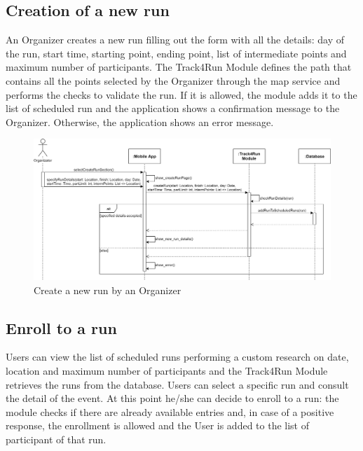 \subsection{Creation of a new run}
An Organizer creates a new run filling out the form with all the details: day of the run, start time, starting point, ending point, list of intermediate points and maximum number of participants. The Track4Run Module defines the path that contains all the points selected by the Organizer through the map service and performs the checks to validate the run. If it is allowed, the module adds it to the list of scheduled run and the application shows a confirmation message to the Organizer. Otherwise, the application shows an error message.

\begin{figure}[H]

    \centering
    \includegraphics[scale=0.16]{./Pictures/createRunSeqDiagDD.png}
    \caption{Create a new run by an Organizer}
    
\end{figure}

\subsection{Enroll to a run}
Users can view the list of scheduled runs performing a custom research on date, location and maximum number of participants and the Track4Run Module retrieves the runs from the database. Users can select a specific run and consult the detail of the event. At this point he/she can decide to enroll to a run: the module checks if there are already available entries and, in case of a positive response, the enrollment is allowed and the User is added to the list of participant of that run.

